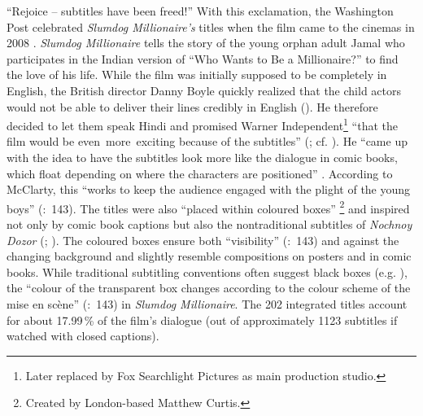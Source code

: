 ``Rejoice – subtitles have been freed!” With this exclamation, the Washington Post celebrated \textit{Slumdog Millionaire’s} titles when the film came to the cinemas in 2008 \citep{Beckman2008}. \textit{Slumdog Millionaire} tells the story of the young orphan adult Jamal who participates in the Indian version of “Who Wants to Be a Millionaire?” to find the love of his life. While the film was initially supposed to be completely in English, the British director Danny Boyle quickly realized that the child actors would not be able to deliver their lines credibly in English (\citeyear{Beckman2008}). He therefore decided to let them speak Hindi and promised Warner Independent\footnote{Later replaced by Fox Searchlight Pictures as main production studio.} “that the film would be even~more~exciting because of the subtitles” (\citealt{Beckman2008}; cf. \citealt{Kofoed2011}). He “came up with the idea to have the subtitles look more like the dialogue in comic books, which float depending on where the characters are positioned” \citep{Beckman2008}. According to McClarty, this “works to keep the audience engaged with the plight of the young boys” (\citeyear{mcclarty2012}:~143). The titles were also “placed within coloured  boxes” \citep{Kofoed2011}\footnote{Created by London-based  Matthew Curtis.} and inspired not only by comic book captions but also the nontraditional subtitles of \textit{Nochnoy Dozor} (\citealt{Beckman2008}; \citealt{Kofoed2011}). The coloured boxes ensure both “visibility” (\citealt{mcclarty2012}:~143) and  against the changing background and slightly resemble compositions on posters and in comic books. While traditional subtitling conventions often suggest black boxes (e.g. \citealt{Karamitroglou1998}), the “colour of the transparent box changes according to the colour scheme of the mise en scène” (\citealt{mcclarty2012}:~143) in \textit{Slumdog Millionaire}. The 202 integrated titles account for about 17.99\,\% of the film’s dialogue (out of approximately 1123 subtitles if watched with closed captions).

